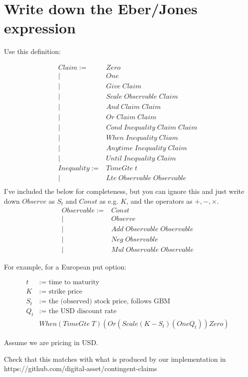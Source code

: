 \documentclass[a4paper]{article}
\begin{document}
\section{Write down the Eber/Jones expression}

Use this definition:

\begin{align*}
Claim := & Zero \\
|& One \\
|& Give \; Claim \\
|& Scale \; Observable \; Claim \\
|& And \; Claim \; Claim \\
|& Or \; Claim \; Claim \\
|& Cond \; Inequality \; Claim \; Claim \\
|& When \; Inequality \; Cliam \\
|& Anytime \; Inequality \; Claim \\
|& Until \; Inequality \; Claim \\
Inequality := & TimeGte \; t \\
| & Lte \; Observable \; Observable \\
\end{align*}
I've included the below for completeness, but you can ignore this and just write down $Observe$ as $S_t$ and $Const$ as e.g. $K$, and the operators as $+, -, \times$.
\begin{align*}
Observable := & Const \\
| & Observe \\
| & Add \; Observable \; Observable \\
| & Neg \; Observable \\
| & Mul \; Observable \; Observable
\end{align*}


For example, for a European put option:

\begin{align*}
  t &:= \text{ time to maturity} \\
  K &:= \text{ strike price} \\
  S_t &:= \text{ the (observed) stock price, follows GBM} \\
  Q_t & := \text{ the USD discount rate } \\
  & When (TimeGte \; T) (Or (Scale (K - S_t) (One Q_t)) Zero)
\end{align*}


Assume we are pricing in USD.

Check that this matches with what is produced by our implementation in https://github.com/digital-asset/contingent-claims
\end{document}
